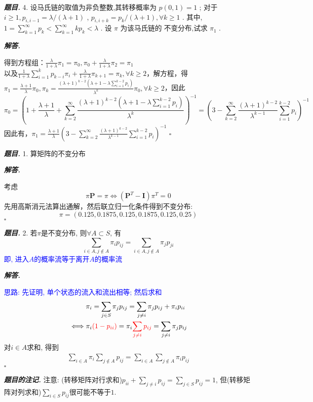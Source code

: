 \documentclass[10pt, a4paper, oneside]{ctexart}
\newenvironment{problem}{\begin{framed}\par\noindent\textbf{\textit{题目. }}}{\end{framed}\par}
\newenvironment{solution}{%
  \par\noindent\textbf{\textit{解答. }}\ignorespaces
}{%
  \hfill\ensuremath{\square}\par %
}
\newenvironment{note}{\par\noindent\textbf{\textit{题目的注记. }}\ignorespaces}{\par}
\begin{document}
\begin{problem}
4. 设马氏链的取值为非负整数,其转移概率为 \( p\left( {0,1}\right)  = 1 \) ; 对于 \( i \geq  1,{p}_{i,i - 1} = \lambda /\left( {\lambda  + 1}\right)  \) ,  \( {p}_{i,i + k} = {p}_{k}/\left( {\lambda  + 1}\right) ,\forall k \geq  1 \) . 其中, \( 1 = \mathop{\sum }\limits_{{k = 1}}^{\infty }{p}_{k} < \mathop{\sum }\limits_{{k = 1}}^{\infty }k{p}_{k} < \lambda  \) . 设 \( \pi  \) 为该马氏链的 不变分布,试求 \( {\pi }_{1} \) .
\end{problem}
\begin{solution}
得到方程组：$\frac{\lambda}{1+\lambda}\pi_1=\pi_0, \pi_0+\frac{\lambda}{1+\lambda}\pi_2=\pi_1$\\以及$\frac{1}{1+\lambda}\sum_{i=1}^{k} p_{k-i}\pi_{i}+\frac{\lambda}{1+\lambda}\pi_{k+1}=\pi_{k},\forall k\geq2$，解方程，得\\
$\pi_1=\frac{\lambda+1}{\lambda}\pi_0, \pi_k=\frac{(\lambda+1)^{k-2}(\lambda+1-\lambda\sum_{i=1}^{k-2}p_i)}{\lambda^k}\pi_0,\forall k\geq 2$，因此
$$\pi_0=(1+\frac{\lambda+1}{\lambda}+\sum_{k=2}^{\infty}\frac{(\lambda+1)^{k-2}(\lambda+1-\lambda\sum_{i=1}^{k-2}p_i)}{\lambda^k})^{-1}=(3-\sum_{k=2}^{\infty}\frac{(\lambda+1)^{k-2}}{\lambda^{k-1}}\sum_{i=1}^{k-2}p_i)^{-1}$$
因此有，$\pi_1=\frac{\lambda+1}{\lambda}(3-\sum_{k=2}^{\infty}\frac{(\lambda+1)^{k-2}}{\lambda^{k-1}}\sum_{i=1}^{k-2}p_i)^{-1}$
\end{solution}

\begin{problem}
1. 算矩阵的不变分布
\end{problem}
\begin{solution}
考虑
$$\pi\mathbf{P}=\pi \iff (\mathbf{P}^T-\mathbf{I})\pi^T=0$$
先用高斯消元法算出通解，然后联立归一化条件得到不变分布:
$$\pi=(0.125 , 0.1875, 0.125 , 0.1875, 0.125 , 0.25)$$
\end{solution}

\begin{problem}
    2. 若$\pi$是不变分布, 则$\forall A\subset S$, 有 
$$\sum_{i\in A,j\notin A} \pi_i p_{ij} = \sum_{i\in A,j\notin A}\pi_j p_{ji}$$
\textcolor{blue}{即, 进入$A$的概率流等于离开$A$的概率流}
\end{problem}
\begin{solution}
    \textcolor{blue}{思路: 先证明, 单个状态的流入和流出相等; 然后求和}
\begin{align*}
    &\pi_i=\sum_{j\in S}\pi_jp_{ij}=\sum_{j\neq i}\pi_j p_{ij}+\pi_i p_{ii}\\
    \iff &\pi_i\textcolor{red}{(1-p_{ii})}=\pi_i\textcolor{red}{\sum_{j\neq i}p_{ij}}=\sum_{j\neq i}\pi_jp_{ij}
\end{align*}
对$i\in A$求和, 得到
\begin{align*}
    \sum_{i\in A}\pi_i\sum_{j\notin A}p_{ij}=\sum_{i\in A}\sum_{j\notin A}\pi_i p_{ij}
\end{align*}
\end{solution}
\begin{note}
注意: (转移矩阵对行求和)$p_{ii}+\sum_{j\neq i}p_{ij}=\sum_{j\in S}p_{ij}=1$, 但(转移矩阵对列求和)$\sum_{i\in S}p_{ij}$很可能不等于$1$.
\end{note}
\end{document}
